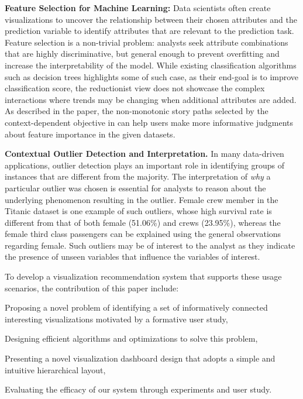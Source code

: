 \textbf{Feature Selection for Machine Learning:} Data scientists often create visualizations to uncover the relationship between their chosen attributes and the prediction variable to identify attributes that are relevant to the prediction task. Feature selection is a non-trivial problem: analysts seek attribute combinations that are highly discriminative, but general enough to prevent overfitting and increase the interpretability of the model. While existing classification algorithms such as decision trees highlights some of such case, as their end-goal is to improve classification score, the reductionist view does not showcase the complex interactions where trends may be changing when additional attributes are added. As described in the paper, the non-monotonic story paths selected by the context-dependent objective in \system can help users make more informative judgments about feature importance in the given datasets. 

\textbf{Contextual Outlier Detection and Interpretation.} In many data-driven applications, outlier detection plays an important role in identifying groups of instances that are different from the majority. The interpretation of \textit{why} a particular outlier was chosen is essential for analysts to reason about the underlying phenomenon resulting in the outlier. Female crew member in the Titanic dataset is one example of such outliers, whose high survival rate is different from that of both female (51.06\%) and crews (23.95\%), whereas the female third class passengers can be explained using the general observations regarding female. Such outliers may be of interest to the analyst as they indicate the presence of unseen variables that influence the variables of interest.

\par To develop a visualization recommendation system that supports these usage scenarios, the contribution of this paper include: 
\squishlist
\item Proposing a novel problem of identifying a set of informatively connected interesting visualizations motivated by a formative user study,
\item Designing efficient algorithms and optimizations to solve this problem,  
\item Presenting a novel visualization dashboard design that adopts a simple and intuitive hierarchical layout,
\item Evaluating the efficacy of our system through experiments and user study.
\squishend
